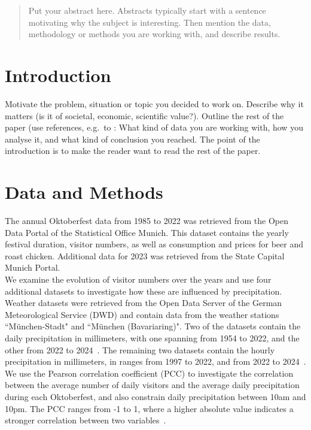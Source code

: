 \documentclass{article}
\theoremstyle{plain}
\theoremstyle{definition}
\theoremstyle{remark}
\begin{document}
\printAffiliationsAndNotice{\icmlEqualContribution} %

\begin{abstract}
Put your abstract here. Abstracts typically start with a sentence motivating why the subject is interesting. Then mention the data, methodology or methods you are working with, and describe results. 
\end{abstract}

\section{Introduction}\label{sec:intro}

Motivate the problem, situation or topic you decided to work on. Describe why it matters (is it of societal, economic, scientific value?). Outline the rest of the paper (use references, e.g.~to : What kind of data you are working with, how you analyse it, and what kind of conclusion you reached. The point of the introduction is to make the reader want to read the rest of the paper.

\section{Data and Methods}\label{sec:methods}
The annual Oktoberfest data from 1985 to 2022 was retrieved from the Open Data Portal of the Statistical Office Munich. This dataset contains the yearly festival duration, visitor numbers, as well as consumption and prices for beer and roast chicken. Additional data for 2023 was retrieved from the State Capital Munich Portal. \\
We examine the evolution of visitor numbers over the years and use four additional datasets to investigate how these are influenced by precipitation. Weather datasets were retrieved from the Open Data Server of the German Meteorological Service (DWD) and contain data from the weather stations ``München-Stadt" and ``München (Bavariaring)". Two of the datasets contain the daily precipitation in millimeters, with one spanning from 1954 to 2022, and the other from 2022 to 2024~\citep{3,4}. The remaining two datasets contain the hourly precipitation in millimeters, in ranges from 1997 to 2022, and from 2022 to 2024~\citep{1,2}. We use the Pearson correlation coefficient (PCC) to investigate the correlation between the average number of daily visitors and the average daily precipitation during each Oktoberfest, and also constrain daily precipitation between 10am and 10pm. The PCC ranges from -1 to 1, where a higher absolute value indicates a stronger correlation between two variables~\cite{thonield}.\\
\end{document}
